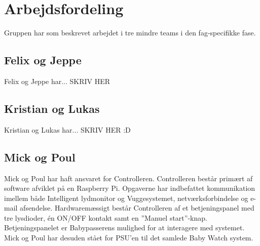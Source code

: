 \section{Arbejdsfordeling}

Gruppen har som beskrevet arbejdet i tre mindre teams i den fag-specifikke fase. 

\subsection*{Felix og Jeppe}
Felix og Jeppe har... SKRIV HER

\subsection*{Kristian og Lukas}
Kristian og Lukas har... SKRIV HER :D

\subsection*{Mick og Poul}
Mick og Poul har haft ansvaret for Controlleren. Controlleren består primært af software afviklet på en Raspberry Pi. Opgaverne har indbefattet kommunikation imellem både Intelligent lydmonitor og Vuggesystemet, netværksforbindelse og e-mail afsendelse. 
Hardwaremæssigt består Controlleren af et betjeningspanel med tre lysdioder, én ON/OFF kontakt samt en ''Manuel start''-knap. Betjeningspanelet er Babypasserens mulighed for at interagere med systemet.
Mick og Poul har desuden stået for PSU'en til det samlede Baby Watch system.


